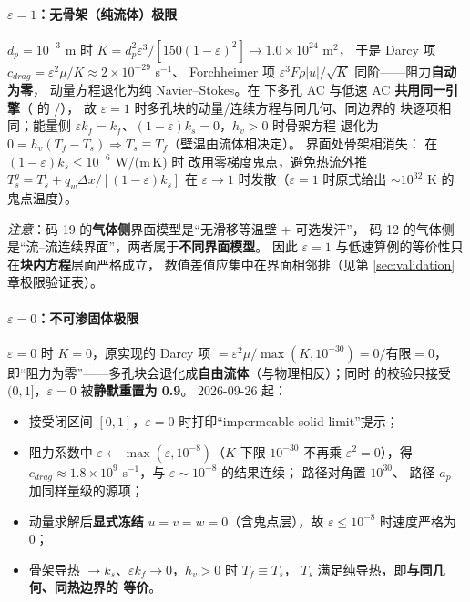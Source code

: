 \paragraph{$\varepsilon=1$：无骨架（纯流体）极限}
$d_p=10^{-3}$ m 时 $K=d_p^2\varepsilon^3/[150(1-\varepsilon)^2]\to1.0\times10^{24}$ m$^2$，
于是 Darcy 项 $c_{drag}=\varepsilon^2\mu/K\approx2\times10^{-29}$ s$^{-1}$、
Forchheimer 项 $\varepsilon^3F\rho\lvert u\rvert/\sqrt{K}$ 同阶——阻力\textbf{自动为零}，
动量方程退化为纯 Navier--Stokes。在  下多孔 AC 与低速 AC
\textbf{共用同一引擎}（ 的 /），
故 $\varepsilon=1$ 时多孔块的动量/连续方程与同几何、同边界的 
块逐项相同；能量侧 $\varepsilon k_f=k_f$、$(1-\varepsilon)k_s=0$，$h_v>0$ 时骨架方程
退化为 $0=h_v(T_f-T_s)\Rightarrow T_s\equiv T_f$（壁温由流体相决定）。
界面处骨架相消失： 在 $(1-\varepsilon)k_s\le10^{-6}$ W/(m\,K) 时
改用零梯度鬼点，避免热流外推 $T_s^{g}=T_s^{i}+q_w\Delta x/[(1-\varepsilon)k_s]$
在 $\varepsilon\to1$ 时发散（$\varepsilon=1$ 时原式给出 $\sim10^{32}$ K 的鬼点温度）。

\emph{注意}：码 19 的\textbf{气体侧}界面模型是“无滑移等温壁 + 可选发汗”，
码 12 的气体侧是“流--流连续界面”，两者属于\textbf{不同界面模型}。
因此 $\varepsilon=1$ 与低速算例的等价性只在\textbf{块内方程}层面严格成立，
数值差值应集中在界面相邻排（见第 \ref{sec:validation} 章极限验证表）。

\paragraph{$\varepsilon=0$：不可渗固体极限}
$\varepsilon=0$ 时 $K=0$，原实现的 Darcy 项 $=\varepsilon^2\mu/\max(K,10^{-30})=0/\text{有限}=0$，
即“阻力为零”——多孔块会退化成\textbf{自由流体}（与物理相反）；同时 
的校验只接受 $(0,1]$，$\varepsilon=0$ 被\textbf{静默重置为 0.9}。
2026-09-26 起：
\begin{itemize}
  \item {} 接受闭区间 $[0,1]$，$\varepsilon=0$ 时打印“impermeable-solid limit”提示；
  \item 阻力系数中 $\varepsilon\leftarrow\max(\varepsilon,10^{-8})$（$K$ 下限 $10^{-30}$ 不再乘
        $\varepsilon^2=0$），得 $c_{drag}\approx1.8\times10^{9}$ s$^{-1}$，与 $\varepsilon\sim10^{-8}$
        的结果连续； 路径对角置 $10^{30}$、 路径 $a_p$ 加同样量级的源项；
  \item 动量求解后\textbf{显式冻结} $u=v=w=0$（含鬼点层），故 $\varepsilon\le10^{-8}$ 时速度严格为 0；
  \item 骨架导热 $\to k_s$、$\varepsilon k_f\to0$，$h_v>0$ 时 $T_f\equiv T_s$，
        $T_s$ 满足纯导热，即\textbf{与同几何、同热边界的  等价}。
\end{itemize}

